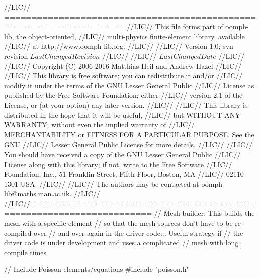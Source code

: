 \begin{DoxyCodeInclude}
\textcolor{comment}{//LIC// ====================================================================}
\textcolor{comment}{//LIC// This file forms part of oomph-lib, the object-oriented, }
\textcolor{comment}{//LIC// multi-physics finite-element library, available }
\textcolor{comment}{//LIC// at http://www.oomph-lib.org.}
\textcolor{comment}{//LIC// }
\textcolor{comment}{//LIC//    Version 1.0; svn revision $LastChangedRevision$}
\textcolor{comment}{//LIC//}
\textcolor{comment}{//LIC// $LastChangedDate$}
\textcolor{comment}{//LIC// }
\textcolor{comment}{//LIC// Copyright (C) 2006-2016 Matthias Heil and Andrew Hazel}
\textcolor{comment}{//LIC// }
\textcolor{comment}{//LIC// This library is free software; you can redistribute it and/or}
\textcolor{comment}{//LIC// modify it under the terms of the GNU Lesser General Public}
\textcolor{comment}{//LIC// License as published by the Free Software Foundation; either}
\textcolor{comment}{//LIC// version 2.1 of the License, or (at your option) any later version.}
\textcolor{comment}{//LIC// }
\textcolor{comment}{//LIC// This library is distributed in the hope that it will be useful,}
\textcolor{comment}{//LIC// but WITHOUT ANY WARRANTY; without even the implied warranty of}
\textcolor{comment}{//LIC// MERCHANTABILITY or FITNESS FOR A PARTICULAR PURPOSE.  See the GNU}
\textcolor{comment}{//LIC// Lesser General Public License for more details.}
\textcolor{comment}{//LIC// }
\textcolor{comment}{//LIC// You should have received a copy of the GNU Lesser General Public}
\textcolor{comment}{//LIC// License along with this library; if not, write to the Free Software}
\textcolor{comment}{//LIC// Foundation, Inc., 51 Franklin Street, Fifth Floor, Boston, MA}
\textcolor{comment}{//LIC// 02110-1301  USA.}
\textcolor{comment}{//LIC// }
\textcolor{comment}{//LIC// The authors may be contacted at oomph-lib@maths.man.ac.uk.}
\textcolor{comment}{//LIC// }
\textcolor{comment}{//LIC//====================================================================}
\textcolor{comment}{// Mesh builder: This builds the mesh with a specific element}
\textcolor{comment}{// so that the mesh sources don't have to be re-compiled over}
\textcolor{comment}{// and over again in the driver code... Useful strategy if}
\textcolor{comment}{// the driver code is under development and uses a complicated}
\textcolor{comment}{// mesh with long compile times}

\textcolor{comment}{// Include Poisson elements/equations}
\textcolor{preprocessor}{#include "poisson.h"}


\end{DoxyCodeInclude}
